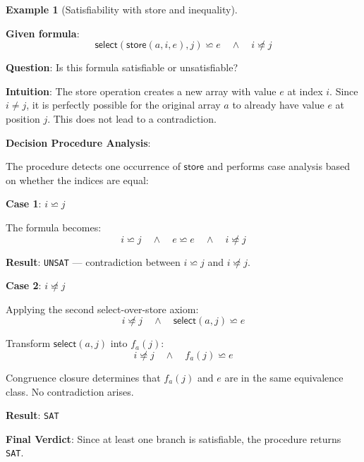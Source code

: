 \documentclass[11pt,a4paper]{article}
\theoremstyle{definition}
\newtheorem{example}{Example}[section]
\theoremstyle{plain}
\theoremstyle{remark}
\begin{document}
\begin{example}[Satisfiability with store and inequality]
\begin{tcolorbox}[colback=green!5!white,colframe=green!75!black,title=\textbf{Example 1: SAT with Index Inequality},breakable]
\textbf{Given formula}:
\[
\textsf{select}(\textsf{store}(a, i, e), j) \backsimeq e \quad \wedge \quad i \not\backsimeq j
\]

\textbf{Question}: Is this formula satisfiable or unsatisfiable?

\vspace{0.3em}

\textbf{Intuition}: The store operation creates a new array with value $e$ at index $i$. Since $i \neq j$, it is perfectly possible for the original array $a$ to already have value $e$ at position $j$. This does not lead to a contradiction.

\vspace{0.5em}

\textbf{Decision Procedure Analysis}:

The procedure detects one occurrence of $\textsf{store}$ and performs case analysis based on whether the indices are equal:

\vspace{0.3em}

\textbf{Case 1}: $i \backsimeq j$

The formula becomes:
\[
i \backsimeq j \quad \wedge \quad e \backsimeq e \quad \wedge \quad i \not\backsimeq j
\]

\textbf{Result}: \texttt{UNSAT} — contradiction between $i \backsimeq j$ and $i \not\backsimeq j$.

\vspace{0.3em}

\textbf{Case 2}: $i \not\backsimeq j$

Applying the second select-over-store axiom:
\[
i \not\backsimeq j \quad \wedge \quad \textsf{select}(a, j) \backsimeq e
\]

Transform $\textsf{select}(a, j)$ into $f_a(j)$:
\[
i \not\backsimeq j \quad \wedge \quad f_a(j) \backsimeq e
\]

Congruence closure determines that $f_a(j)$ and $e$ are in the same equivalence class. No contradiction arises.

\textbf{Result}: \texttt{SAT}

\vspace{0.5em}

\textbf{Final Verdict}: Since at least one branch is satisfiable, the procedure returns \texttt{SAT}.
\end{tcolorbox}
\end{example}
\end{document}
